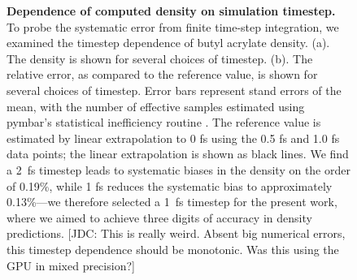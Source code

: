 \documentclass[aps,pre,twocolumn,nofootinbib,superscriptaddress,linenumbers]{revtex4-1}
\begin{document}
\begin{figure}


\caption{
{\bf Dependence of computed density on simulation timestep.}
To probe the systematic error from finite time-step integration, we examined the timestep dependence of butyl acrylate density.  
(a).  The density is shown for several choices of timestep.  
(b).  The relative error, as compared to the reference value, is shown for several choices of timestep.  
Error bars represent stand errors of the mean, with the number of effective samples estimated using pymbar's statistical inefficiency routine \cite{shirts2008statistically}.  
The reference value is estimated by linear extrapolation to 0 fs using the 0.5 fs and 1.0 fs data points; the linear extrapolation is shown as black lines.  
We find a 2~fs timestep leads to systematic biases in the density on the order of 0.19\%, while 1 fs reduces the systematic bias to approximately 0.13\%---we therefore selected a 1~fs timestep for the present work, where we aimed to achieve three digits of accuracy in density predictions.
{\color{red}[JDC: This is really weird. Absent big numerical errors, this timestep dependence should be monotonic.  Was this using the GPU in mixed precision?]}
}
\label{figure:timestep}

\end{figure}
\end{document}
